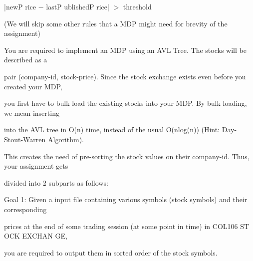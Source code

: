 \documentclass[a4paper,portrait,12pt]{article}
\begin{document}
\begin{flushleft}
|newP rice $-$ lastP ublishedP rice| $>$ threshold
\end{flushleft}


\begin{flushleft}
(We will skip some other rules that a MDP might need for brevity of the assignment)
\end{flushleft}


\begin{flushleft}
You are required to implement an MDP using an AVL Tree. The stocks will be described as a
\end{flushleft}


\begin{flushleft}
pair (company-id, stock-price). Since the stock exchange exists even before you created your MDP,
\end{flushleft}


\begin{flushleft}
you first have to bulk load the existing stocks into your MDP. By bulk loading, we mean inserting
\end{flushleft}


\begin{flushleft}
into the AVL tree in O(n) time, instead of the usual O(nlog(n)) (Hint: Day-Stout-Warren Algorithm).
\end{flushleft}


\begin{flushleft}
This creates the need of pre-sorting the stock values on their company-id. Thus, your assignment gets
\end{flushleft}


\begin{flushleft}
divided into 2 subparts as follows:
\end{flushleft}


\begin{flushleft}
Goal 1: Given a input file containing various symbols (stock symbols) and their corresponding
\end{flushleft}


\begin{flushleft}
prices at the end of some trading session (at some point in time) in COL106 ST OCK EXCHAN GE,
\end{flushleft}


\begin{flushleft}
you are required to output them in sorted order of the stock symbols.
\end{flushleft}
\end{document}
